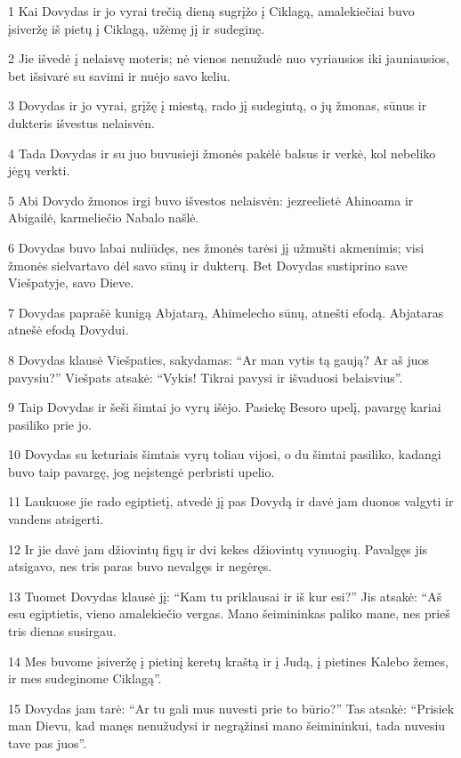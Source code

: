\par 1 Kai Dovydas ir jo vyrai trečią dieną sugrįžo į Ciklagą, amalekiečiai buvo įsiveržę iš pietų į Ciklagą, užėmę jį ir sudeginę. 
\par 2 Jie išvedė į nelaisvę moteris; nė vienos nenužudė nuo vyriausios iki jauniausios, bet išsivarė su savimi ir nuėjo savo keliu. 
\par 3 Dovydas ir jo vyrai, grįžę į miestą, rado jį sudegintą, o jų žmonas, sūnus ir dukteris išvestus nelaisvėn. 
\par 4 Tada Dovydas ir su juo buvusieji žmonės pakėlė balsus ir verkė, kol nebeliko jėgų verkti. 
\par 5 Abi Dovydo žmonos irgi buvo išvestos nelaisvėn: jezreelietė Ahinoama ir Abigailė, karmeliečio Nabalo našlė. 
\par 6 Dovydas buvo labai nuliūdęs, nes žmonės tarėsi jį užmušti akmenimis; visi žmonės sielvartavo dėl savo sūnų ir dukterų. Bet Dovydas sustiprino save Viešpatyje, savo Dieve. 
\par 7 Dovydas paprašė kunigą Abjatarą, Ahimelecho sūnų, atnešti efodą. Abjataras atnešė efodą Dovydui. 
\par 8 Dovydas klausė Viešpaties, sakydamas: “Ar man vytis tą gaują? Ar aš juos pavysiu?” Viešpats atsakė: “Vykis! Tikrai pavysi ir išvaduosi belaisvius”. 
\par 9 Taip Dovydas ir šeši šimtai jo vyrų išėjo. Pasiekę Besoro upelį, pavargę kariai pasiliko prie jo. 
\par 10 Dovydas su keturiais šimtais vyrų toliau vijosi, o du šimtai pasiliko, kadangi buvo taip pavargę, jog neįstengė perbristi upelio. 
\par 11 Laukuose jie rado egiptietį, atvedė jį pas Dovydą ir davė jam duonos valgyti ir vandens atsigerti. 
\par 12 Ir jie davė jam džiovintų figų ir dvi kekes džiovintų vynuogių. Pavalgęs jis atsigavo, nes tris paras buvo nevalgęs ir negėręs. 
\par 13 Tuomet Dovydas klausė jį: “Kam tu priklausai ir iš kur esi?” Jis atsakė: “Aš esu egiptietis, vieno amalekiečio vergas. Mano šeimininkas paliko mane, nes prieš tris dienas susirgau. 
\par 14 Mes buvome įsiveržę į pietinį keretų kraštą ir į Judą, į pietines Kalebo žemes, ir mes sudeginome Ciklagą”. 
\par 15 Dovydas jam tarė: “Ar tu gali mus nuvesti prie to būrio?” Tas atsakė: “Prisiek man Dievu, kad manęs nenužudysi ir negrąžinsi mano šeimininkui, tada nuvesiu tave pas juos”. 
